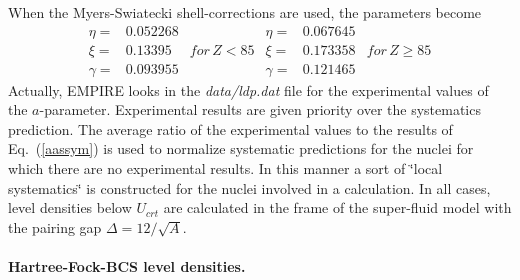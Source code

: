 When the Myers-Swiatecki shell-corrections are used, the parameters become
\begin{equation}
\begin{array}{ccc}
\eta= & 0.052268 &  \\
\xi= & 0.13395 & for\, Z<85 \\
\gamma= & 0.093955 &
\end{array}%
\begin{array}{ccc}
\eta= & 0.067645 &  \\
\xi= & 0.173358 & for\, Z\geq85 \\
\gamma= & 0.121465 &
\end{array}%
\end{equation}
Actually, EMPIRE looks in the \emph{data/ldp.dat} file for the experimental
values of the $a$-parameter. Experimental results are given priority over
the systematics prediction. The average ratio of the experimental values to
the results of Eq.~(\ref{aassym}) is used to normalize systematic predictions
for the nuclei for which there are no experimental results. In this manner a sort
of  \char`\"{}local systematics\char`\"{} is constructed for the nuclei
involved in a calculation. In all cases, level densities%
 below $U_{crt}$ are calculated in the frame of the
super-fluid model \cite{igna} with the pairing gap $\Delta=12/%
\sqrt{A}$.

\medskip

\paragraph{Hartree-Fock-BCS level densities.}

